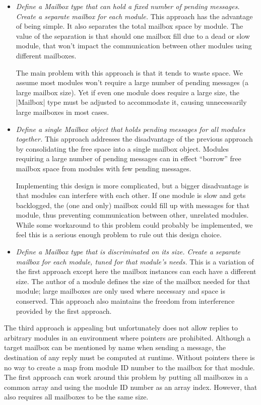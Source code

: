 \begin{itemize}
\item \emph{Define a Mailbox type that can hold a fixed number of pending messages. Create a
    separate mailbox for each module.} This approach has the advantage of being simple. It also
  separates the total mailbox space by module. The value of the separation is that should one
  mailbox fill due to a dead or slow module, that won't impact the communication between other
  modules using different mailboxes.

  The main problem with this approach is that it tends to waste space. We assume most modules
  won't require a large number of pending messages (a large mailbox size). Yet if even one
  module does require a large size, the |Mailbox| type must be adjusted to accommodate it,
  causing unnecessarily large mailboxes in most cases.

\item \emph{Define a single Mailbox object that holds pending messages for all modules
    together.} This approach addresses the disadvantage of the previous approach by
  consolidating the free space into a single mailbox object. Modules requiring a large number of
  pending messages can in effect ``borrow'' free mailbox space from modules with few pending
  messages.

  Implementing this design is more complicated, but a bigger disadvantage is that modules can
  interfere with each other. If one module is slow and gets backlogged, the (one and only)
  mailbox could fill up with messages for that module, thus preventing communication between
  other, unrelated modules. While some workaround to this problem could probably be implemented,
  we feel this is a serious enough problem to rule out this design choice.

\item \emph{Define a Mailbox type that is discriminated on its size. Create a separate mailbox
    for each module, tuned for that module's needs.} This is a variation of the first approach
  except here the mailbox instances can each have a different size. The author of a module
  defines the size of the mailbox needed for that module; large mailboxes are only used where
  necessary and space is conserved. This approach also maintains the freedom from interference
  provided by the first approach.
\end{itemize}

The third approach is appealing but unfortunately does not allow replies to arbitrary modules in
an environment where pointers are prohibited. Although a target mailbox can be mentioned by name
when sending a message, the destination of any reply must be computed at runtime. Without
pointers there is no way to create a map from module ID number to the mailbox for that module.
The first approach can work around this problem by putting all mailboxes in a common array and
using the module ID number as an array index. However, that also requires all mailboxes to be
the same size.


